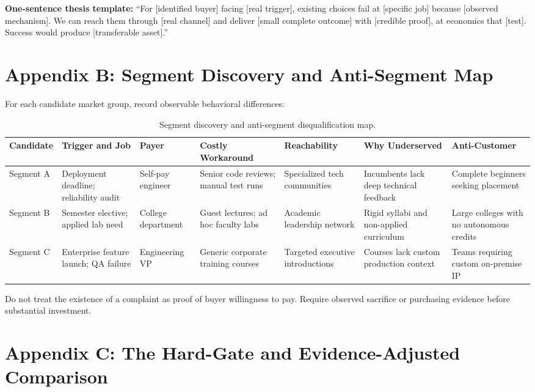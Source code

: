 \textbf{One-sentence thesis template:} ``For [identified buyer] facing [real trigger], existing choices fail at [specific job] because [observed mechanism]. We can reach them through [real channel] and deliver [small complete outcome] with [credible proof], at economics that [test]. Success would produce [transferable asset].''

\section*{Appendix B: Segment Discovery and Anti-Segment Map}

For each candidate market group, record observable behavioral differences:

\begin{table}[t]
\centering
\small
\begin{tabularx}{\textwidth}{l p{2.4cm} p{1.8cm} p{2.4cm} p{2.0cm} p{2.4cm} X}
\toprule
\textbf{Candidate} & \textbf{Trigger and Job} & \textbf{Payer} & \textbf{Costly Workaround} & \textbf{Reachability} & \textbf{Why Underserved} & \textbf{Anti-Customer} \\
\midrule
Segment A & Deployment deadline; reliability audit & Self-pay engineer & Senior code reviews; manual test runs & Specialized tech communities & Incumbents lack deep technical feedback & Complete beginners seeking placement \\
Segment B & Semester elective; applied lab need & College department & Guest lectures; ad hoc faculty labs & Academic leadership network & Rigid syllabi and non-applied curriculum & Large colleges with no autonomous credits \\
Segment C & Enterprise feature launch; QA failure & Engineering VP & Generic corporate training courses & Targeted executive introductions & Courses lack custom production context & Teams requiring custom on-premise IP \\
\bottomrule
\end{tabularx}
\caption{Segment discovery and anti-segment disqualification map.}
\label{tab:ch7-anti-segment-map}
\end{table}

Do not treat the existence of a complaint as proof of buyer willingness to pay. Require observed sacrifice or purchasing evidence before substantial investment.

\section*{Appendix C: The Hard-Gate and Evidence-Adjusted Comparison}


